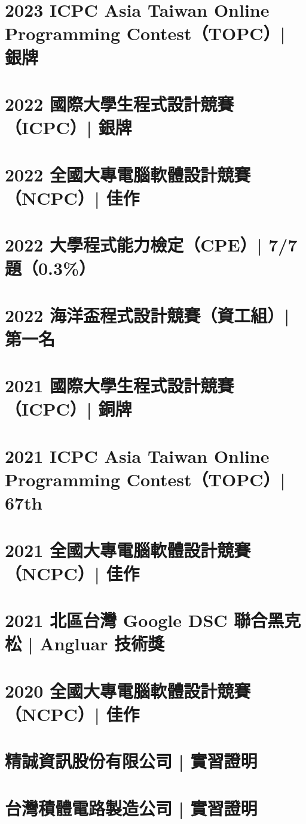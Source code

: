 \documentclass{toc}
\begin{document}
\section{2023 ICPC Asia Taiwan Online Programming Contest（TOPC）| 銀牌}
\newpage
\section{2022 國際大學生程式設計競賽（ICPC）| 銀牌}
\newpage
\section{2022 全國大專電腦軟體設計競賽（NCPC）| 佳作}
\newpage
\section{2022 大學程式能力檢定（CPE）| 7/7題（0.3\%）}
\newpage
\section{2022 海洋盃程式設計競賽（資工組）| 第一名}
\newpage
\section{2021 國際大學生程式設計競賽（ICPC）| 銅牌}
\newpage
\section{2021 ICPC Asia Taiwan Online Programming Contest（TOPC）| 67th}
\newpage
\section{2021 全國大專電腦軟體設計競賽（NCPC）| 佳作}
\newpage
\section{2021 北區台灣 Google DSC 聯合黑克松 | Angluar 技術獎}
\newpage
\section{2020 全國大專電腦軟體設計競賽（NCPC）| 佳作}
\newpage
\section{精誠資訊股份有限公司 | 實習證明}
\newpage
\section{台灣積體電路製造公司 | 實習證明}
\newpage
\end{document}
